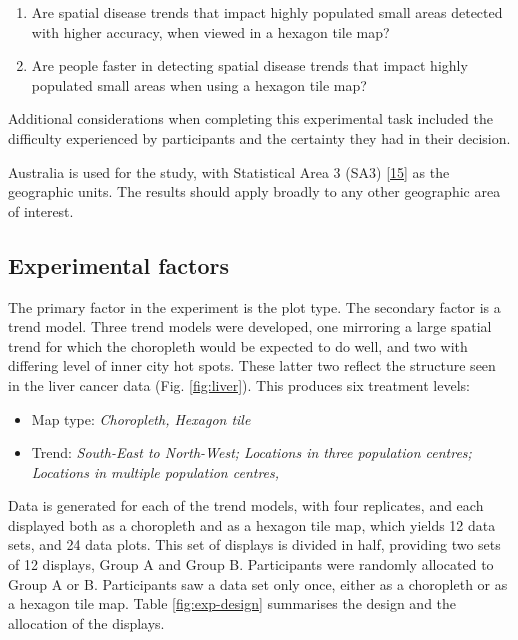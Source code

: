 \documentclass[conference,final,]{IEEEtran}
\providecommand{\tightlist}{%
  \setlength{\itemsep}{0pt}\setlength{\parskip}{0pt}}
\begin{document}
\begin{enumerate}
\def\labelenumi{\arabic{enumi}.}
\tightlist
\item
  Are spatial disease trends that impact highly populated small areas detected with higher accuracy, when viewed in a hexagon tile map?
\item
  Are people faster in detecting spatial disease trends that impact highly populated small areas when using a hexagon tile map?
\end{enumerate}

Additional considerations when completing this experimental task included the difficulty experienced by participants and the certainty they had in their decision.

Australia is used for the study, with Statistical Area 3 (SA3) {[}\protect\hyperlink{ref-abs2016}{15}{]} as the geographic units. The results should apply broadly to any other geographic area of interest.

\hypertarget{experimental-factors}{%
\subsection{Experimental factors}\label{experimental-factors}}

The primary factor in the experiment is the plot type. The secondary factor is a trend model. Three trend models were developed, one mirroring a large spatial trend for which the choropleth would be expected to do well, and two with differing level of inner city hot spots. These latter two reflect the structure seen in the liver cancer data (Fig. \ref{fig:liver}). This produces six treatment levels:

\begin{itemize}
\tightlist
\item
  Map type: \emph{Choropleth, Hexagon tile}
\item
  Trend: \emph{South-East to North-West; Locations in three population centres; Locations in multiple population centres, }
\end{itemize}

Data is generated for each of the trend models, with four replicates, and each displayed both as a choropleth and as a hexagon tile map, which yields 12 data sets, and 24 data plots. This set of displays is divided in half, providing two sets of 12 displays, Group A and Group B. Participants were randomly allocated to Group A or B. Participants saw a data set only once, either as a choropleth or as a hexagon tile map. Table \ref{fig:exp-design} summarises the design and the allocation of the displays.
\end{document}

